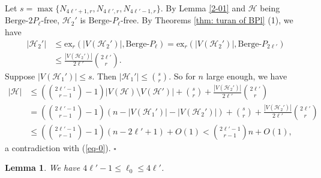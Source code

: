 \documentclass[12pt]{article}%
\newtheorem{lemma}[theorem]{Lemma}
\newenvironment{proof}{{\noindent\it Proof.}}{\hfill $\square$\par}
\newcommand{\ber}{\text{Berge-}}
\newcommand{\mh}{\mathcal{H}}
\begin{document}
\begin{proof} Let $s=\max\{N_{4\ell'+1,r},N_{4\ell',r},N_{4\ell'-1,r}\}$.
 By Lemma \ref{2-01} and  $\mathcal{H}$ being  $\ber 2P_\ell$-free, $\mh_{2}'$ is $\ber P_{\ell}$-free. By Theorems \ref{thm: turan of BPl} (1), we have
     \begin{equation*}
        \begin{aligned}
            |\mh_{2}'|&\leq \mathrm{ex}_r(|V(\mh_{2}')|,\ber P_{\ell})=\mathrm{ex}_r(|V(\mh_{2}')|,\ber P_{2\ell'})\\
           &\leq \frac{|V(\mh_{2}')|}{2\ell'}\binom{2\ell'}{r}.
        \end{aligned}
    \end{equation*}Suppose $|V(\mh_{1}')|\leq s$. Then $|\mh_{1}'|\leq \binom{s}{r}$. So for $n$ large enough, we have
    \begin{equation*}
        \begin{aligned}
            |\mh|&\leq \left(\binom{2\ell'-1}{r-1}-1\right)|V(\mh)\setminus V(\mh')|+\binom{s}{r}+\frac{|V(\mh_{2}')|}{2\ell'}\binom{2\ell'}{r} \\
            &=\left(\binom{2\ell'-1}{r-1}-1\right)(n-|V(\mh_{1}')|-|V(\mh_{2}')|)+\binom{s}{r}+\frac{|V(\mh_{2}')|}{2\ell'}\binom{2\ell'}{r}\\
            &\leq \left(\binom{2\ell'-1}{r-1}-1\right)(n-2\ell'+1)+O(1)<\binom{2\ell'-1}{r-1}n+O(1),
        \end{aligned}
    \end{equation*}a contradiction with (\ref{eq-0}).
 \end{proof}
\begin{lemma}\label{lem: contains P4l}
    We have $4\ell'-1\leq\ell_0\leq 4\ell'$.
\end{lemma}
\end{document}

